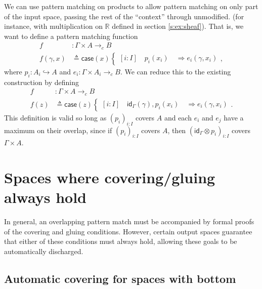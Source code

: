 \documentclass[conference]{IEEEtran}
\newcommand{\hookto}{\hookrightarrow}
\newcommand{\cto}{\to_c}
\newcommand{\R}{\mathbb{R}}
\newcommand{\Branch}{\Rightarrow}
\begin{document}
We can use pattern matching on products to allow pattern matching on only part of the input space, passing the rest of the ``context'' through unmodified. (for instance, with multiplication on $\R$ defined in section \ref{s:ex:sheaf}). That is, we want to define a pattern matching function
\begin{align*}
f &: \Gamma \times A \cto B
\\ f(\gamma, x) &\triangleq \mathsf{case}(x)
\begin{cases}
[i : I] \quad p_i(x_i) \quad \Branch e_i(\gamma, x_i)
\end{cases},
\end{align*}
where $p_i : A_i \hookto A$ and $e_i : \Gamma \times A_i \cto B$.
We can reduce this to the existing construction by defining
\begin{align*}
f &: \Gamma \times A \cto B
\\ f(z) &\triangleq \mathsf{case}(z)
\begin{cases}
[i : I] \quad \mathsf{id}_\Gamma(\gamma) , p_i(x_i) \quad \Branch e_i(\gamma, x_i)
\end{cases}.
\end{align*}
This definition is valid so long as $(p_i)_{i : I}$ covers $A$ and each $e_i$ and $e_j$ have a maximum on their overlap, since if $(p_i)_{i : I}$ covers $A$, then $(\mathsf{id}_\Gamma \otimes p_i)_{i : I}$ covers $\Gamma \times A$.


\section{Spaces where covering/gluing always hold}
\label{s:coverglue}

In general, an overlapping pattern match must be accompanied by formal proofs of the covering and gluing conditions. However, certain output spaces guarantee that either of these conditions must always hold, allowing these goals to be automatically discharged.

\subsection{Automatic covering for spaces with bottom}
\end{document}

